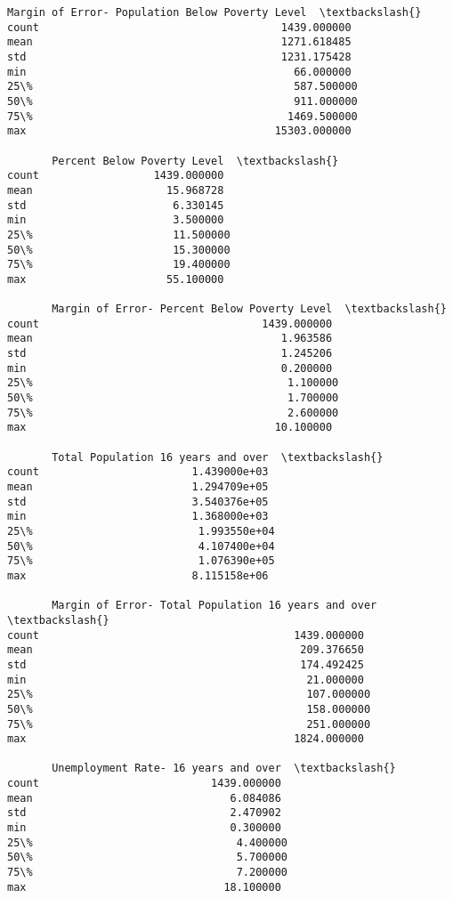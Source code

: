 \documentclass[11pt]{article}
\begin{document}
\begin{tcolorbox}[breakable, size=fbox, boxrule=.5pt, pad at break*=1mm, opacityfill=0]
\begin{Verbatim}[commandchars=\\\{\}]
       Margin of Error- Population Below Poverty Level  \textbackslash{}
count                                      1439.000000
mean                                       1271.618485
std                                        1231.175428
min                                          66.000000
25\%                                         587.500000
50\%                                         911.000000
75\%                                        1469.500000
max                                       15303.000000

       Percent Below Poverty Level  \textbackslash{}
count                  1439.000000
mean                     15.968728
std                       6.330145
min                       3.500000
25\%                      11.500000
50\%                      15.300000
75\%                      19.400000
max                      55.100000

       Margin of Error- Percent Below Poverty Level  \textbackslash{}
count                                   1439.000000
mean                                       1.963586
std                                        1.245206
min                                        0.200000
25\%                                        1.100000
50\%                                        1.700000
75\%                                        2.600000
max                                       10.100000

       Total Population 16 years and over  \textbackslash{}
count                        1.439000e+03
mean                         1.294709e+05
std                          3.540376e+05
min                          1.368000e+03
25\%                          1.993550e+04
50\%                          4.107400e+04
75\%                          1.076390e+05
max                          8.115158e+06

       Margin of Error- Total Population 16 years and over  \textbackslash{}
count                                        1439.000000
mean                                          209.376650
std                                           174.492425
min                                            21.000000
25\%                                           107.000000
50\%                                           158.000000
75\%                                           251.000000
max                                          1824.000000

       Unemployment Rate- 16 years and over  \textbackslash{}
count                           1439.000000
mean                               6.084086
std                                2.470902
min                                0.300000
25\%                                4.400000
50\%                                5.700000
75\%                                7.200000
max                               18.100000


\end{Verbatim}
\end{tcolorbox}
\end{document}
